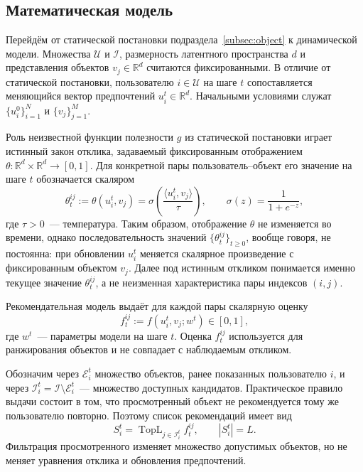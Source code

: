\subsection{Математическая модель}
\label{subsec:loop_setup}

Перейдём от статической постановки подраздела~\ref{subsec:object} к динамической
модели. Множества $\mathcal U$ и $\mathcal I$, размерность латентного
пространства $d$ и представления объектов $v_j\in\mathbb R^d$ считаются
фиксированными. В отличие от статической постановки, пользователю
$i\in\mathcal U$ на шаге $t$ сопоставляется меняющийся вектор предпочтений
$u_i^t\in\mathbb R^d$. Начальными условиями служат
$\{u_i^0\}_{i=1}^N$ и $\{v_j\}_{j=1}^M$.

Роль неизвестной функции полезности $g$ из статической постановки играет
истинный закон отклика, задаваемый фиксированным отображением
$\theta:\mathbb R^d\times\mathbb R^d\to[0,1]$. Для конкретной пары
пользователь--объект его значение на шаге $t$ обозначается скаляром
\begin{equation}
    \theta_t^{ij}
    :=\theta(u_i^t,v_j)
    =\sigma\!\left(\frac{\langle u_i^t,v_j\rangle}{\tau}\right),
    \qquad
    \sigma(z)=\frac{1}{1+e^{-z}},
    \label{eq:true_response}
\end{equation}
где $\tau>0$~--- температура. Таким образом, отображение $\theta$ не изменяется
во времени, однако последовательность значений
$\{\theta_t^{ij}\}_{t\ge0}$, вообще говоря, не постоянна: при обновлении
$u_i^t$ меняется скалярное произведение с фиксированным объектом $v_j$. Далее
под истинным откликом понимается именно текущее значение $\theta_t^{ij}$, а не
неизменная характеристика пары индексов $(i,j)$.

Рекомендательная модель выдаёт для каждой пары скалярную оценку
\begin{equation}
    f_t^{ij}:=f(u_i^t,v_j;w^t)\in[0,1],
    \label{eq:model_score}
\end{equation}
где $w^t$~--- параметры модели на шаге $t$. Оценка $f_t^{ij}$ используется для
ранжирования объектов и не совпадает с наблюдаемым откликом.

Обозначим через $\mathcal E_i^t$ множество объектов, ранее показанных
пользователю $i$, и через
$\mathcal I_i^t=\mathcal I\setminus\mathcal E_i^t$~--- множество доступных
кандидатов. Практическое правило выдачи состоит в том, что просмотренный объект
не рекомендуется тому же пользователю повторно. Поэтому список рекомендаций
имеет вид
\begin{equation}
    S_i^t
    =\operatorname{TopL}_{j\in\mathcal I_i^t} f_t^{ij},
    \qquad |S_i^t|=L.
    \label{eq:top_l}
\end{equation}
Фильтрация просмотренного изменяет множество допустимых объектов, но не меняет
уравнения отклика и обновления предпочтений.

